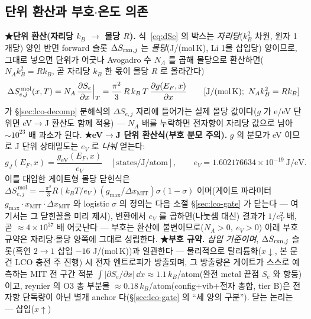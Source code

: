 \subsection{단위 환산과 부호$\cdot$온도 의존}\label{sec:lco-Se-units}
\textbf{★단위 환산(자리당 $k_B$ $\to$ 몰당 $R$).} 식~\eqref{eq:dSe} 의 박스는 \emph{자리당}($k_B^2$ 차원, 원자 1개당) 양인 반면 forward 슬롯
$\Delta S_{\mathrm{rxn},j}$ 는 \emph{몰당}(J/(mol\,K), Li 1몰 삽입당) 양이므로, 그대로 넣으면 단위가 어긋나 Avogadro 수
$N_A$ 를 곱해 몰당으로 환산하면($N_A k_B^2=R k_B$, 곧 자리당 $k_B$ 한 몫이 몰당 $R$ 로 올라간다)
\begin{equation}
\Delta S_{e,j}^{\,\mathrm{mol}}(x,T)=N_A\,\frac{\partial S_e}{\partial x}\Big|_T
=\frac{\pi^2}{3}\,R\,k_B\,T\,\frac{\partial g(E_F,x)}{\partial x}
\qquad[\text{J/(mol\,K)};\ N_A k_B^2=R k_B]
\label{eq:dSemolar}
\end{equation}
가 \S\ref{sec:lco-decomp} 분해식의 $\Delta S_{e,j}$ 자리에 들어가는 실제 몰당 값이다($g$ 가 e/eV 단위면 eV$\to$J
환산도 함께 적용) --- $N_A$ 배를 누락하면 전자항이 자리당 값으로 남아 $\sim10^{23}$ 배 과소가 된다.
\textbf{★eV$\to$J 단위 환산식(부호 분모 주의).} $g$ 의 분모가 eV 이므로 J 단위 상태밀도는 $e_V$ 로 \emph{나눠} 얻는다:
\begin{equation}
g_J(E_F,x)=\frac{g_{\mathrm{eV}}(E_F,x)}{e_V}\quad[\text{states/J/atom}],
\qquad e_V=1.602176634\times10^{-19}\ \text{J/eV}.
\label{eq:gunit}
\end{equation}
이를 대입한 게이트형 몰당 닫힌식은 $\Delta S_{e,j}^{\,\mathrm{mol}}=-\tfrac{\pi^2}{3}R(k_BT/e_V)(g_{\max}/
\Delta x_\mathrm{MIT})\sigma(1-\sigma)$ 이며(게이트 파라미터 $g_{\max}\cdot x_\mathrm{MIT}\cdot\Delta x_\mathrm{MIT}$
와 logistic $\sigma$ 의 정의는 다음 소절 \S\ref{sec:lco-gate} 가 닫는다 --- 여기서는 그 닫힌꼴을 미리 제시),
변환에서 $e_V$ 를 곱하면(나눗셈 대신) 결과가 $1/e_V^2$ 배, 곧
$\approx4\times10^{37}$ 배 어긋난다 --- 부호는
환산에 불변이므로($N_A>0,\ e_V>0$) 아래 부호 규약은 자리당$\cdot$몰당 양쪽에 그대로 성립한다. \textbf{★부호 규약.} \emph{삽입 기준이며}, $\Delta S_{\mathrm{rxn},j}$ 슬롯(흑연 $2\!\to\!1$ 삽입 $-16$ J/(mol\,K))과 일관한다 --- 물리적으로
탈리튬화($x\!\downarrow$, 본 문건 LCO 충전 주 진행) 시 전자 엔트로피가 방출되며, 그 방출량은 게이트가 스스로
예측하는 MIT 전 구간 적분 $\int|\partial S_e/\partial x|\,\dd x\approx1.1\,k_B$/atom(완전 metal 끝점 $S_e$ 와
항등)이고, reynier\cite{reynier2004} 의 O3 총 부분몰 $\approx0.18\,k_B$/atom(config$+$vib$+$전자 총합, tier B)은
전자항 단독량이 아닌 별개 anchor 다(\S\ref{sec:lco-gate} 의 ``세 양의 구분''). 닫는 논리는 --- 삽입($x\!\uparrow$)
